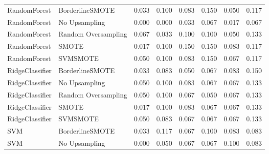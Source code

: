 \begin{tabular}{llllllll}
                RandomForest &     BorderlineSMOTE & 0.033 &                     0.100 &                 0.083 &                  0.150 &                                   0.050 &     0.117 \\
                RandomForest &       No Upsampling & 0.000 &                     0.000 &                 0.033 &                  0.067 &                                   0.017 &     0.067 \\
                RandomForest & Random Oversampling & 0.067 &                     0.033 &                 0.100 &                  0.100 &                                   0.050 &     0.133 \\
                RandomForest &               SMOTE & 0.017 &                     0.100 &                 0.150 &                  0.150 &                                   0.083 &     0.117 \\
                RandomForest &            SVMSMOTE & 0.050 &                     0.100 &                 0.083 &                  0.150 &                                   0.067 &     0.117 \\
             RidgeClassifier &     BorderlineSMOTE & 0.033 &                     0.083 &                 0.050 &                  0.067 &                                   0.083 &     0.150 \\
             RidgeClassifier &       No Upsampling & 0.050 &                     0.100 &                 0.083 &                  0.067 &                                   0.067 &     0.133 \\
             RidgeClassifier & Random Oversampling & 0.050 &                     0.100 &                 0.067 &                  0.050 &                                   0.067 &     0.133 \\
             RidgeClassifier &               SMOTE & 0.017 &                     0.100 &                 0.083 &                  0.067 &                                   0.067 &     0.133 \\
             RidgeClassifier &            SVMSMOTE & 0.050 &                     0.083 &                 0.067 &                  0.067 &                                   0.067 &     0.133 \\
                         SVM &     BorderlineSMOTE & 0.033 &                     0.117 &                 0.067 &                  0.100 &                                   0.083 &     0.083 \\
                         SVM &       No Upsampling & 0.000 &                     0.050 &                 0.067 &                  0.067 &                                   0.100 &     0.083 \\

\end{tabular}
